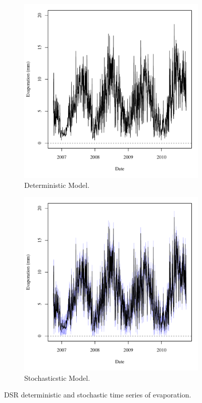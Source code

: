 \begin{linenumbers}
\begin{figure}[htbp]
\centering
	\begin{subfigure}{0.5\textwidth}
		\includegraphics[width=0.9\linewidth]{"Figures/Results_DDSR/A Evap"}
		\caption{Deterministic Model.}
		\label{sub:DSREvapD}	
	\end{subfigure}%
	\begin{subfigure}{0.5\textwidth}
		\includegraphics[width=0.9\linewidth]{"Figures/Results_DSR/A Evap"}
		\caption{Stochasticstic Model.}
		\label{sub:DSREvapS}
	\end{subfigure}
	\caption[DSR deterministic and stochastic time series of evaporation.]{DSR deterministic and stochastic time series of evaporation.}
	\label{fig:DSREvap}
\end{figure}


\end{linenumbers}
